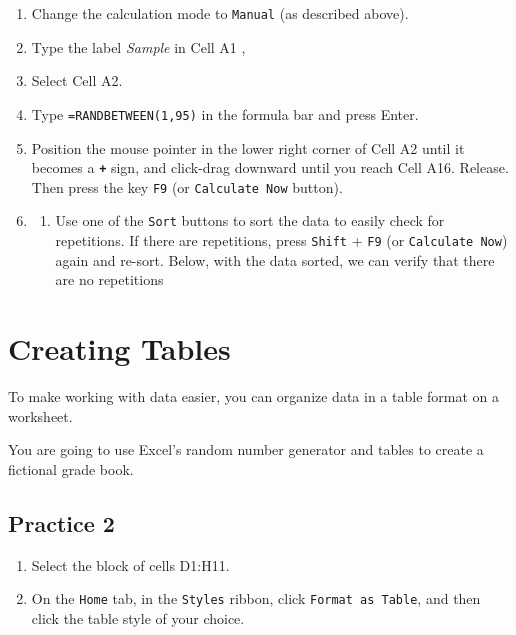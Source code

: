 \documentclass[
  12pt,
  letterpaper,
]{book}
\providecommand{\tightlist}{%
  \setlength{\itemsep}{0pt}\setlength{\parskip}{0pt}}
\begin{document}
\begin{enumerate}
\def\labelenumi{\arabic{enumi}.}
\item
  Change the calculation mode to \texttt{Manual} (as described above).
\item
  Type the label \emph{Sample} in Cell A1 ,
\item
  Select Cell A2.
\item
  Type \texttt{=RANDBETWEEN(1,95)} in the formula bar and press Enter.
\item
  Position the mouse pointer in the lower right corner of Cell A2 until it becomes a \textbf{\texttt{+}} sign, and click-drag downward until you reach Cell A16. Release. Then press the key \texttt{F9} (or \texttt{Calculate\ Now} button).
\item
  \begin{enumerate}
  \def\labelenumii{\arabic{enumii})}
  \setcounter{enumii}{5}
  \tightlist
  \item
    Use one of the \texttt{Sort} buttons to sort the data to easily check for repetitions. If there are repetitions, press \texttt{Shift} + \texttt{F9} (or \texttt{Calculate\ Now}) again and re-sort. Below, with the data sorted, we can verify that there are no repetitions
  \end{enumerate}
\end{enumerate}

\hypertarget{creating-tables}{%
\section{Creating Tables}\label{creating-tables}}

To make working with data easier, you can organize data in a table format on a worksheet.

You are going to use Excel's random number generator and tables to create a fictional grade book.

\hypertarget{practice-2-1}{%
\subsection{Practice 2}\label{practice-2-1}}

\begin{enumerate}
\def\labelenumi{\arabic{enumi}.}
\tightlist
\item
  Select the block of cells D1:H11.
\item
  On the \texttt{Home} tab, in the \texttt{Styles} ribbon, click \texttt{Format\ as\ Table}, and then click the table style of your choice.
\end{enumerate}
\end{document}

